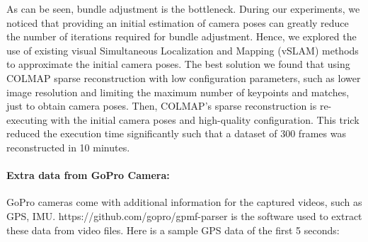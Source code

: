 \documentclass[11pt]{article}
\begin{document}
    As can be seen, bundle adjustment is the bottleneck. During our experiments, we noticed that providing an
    initial estimation of camera poses can greatly reduce the number of iterations required for bundle adjustment.
    Hence, we explored the use of existing visual Simultaneous Localization and Mapping (vSLAM) methods to approximate
    the initial camera poses. The best solution we found that using COLMAP sparse reconstruction with low configuration
    parameters, such as lower image resolution and limiting the maximum number of keypoints and matches, just to obtain
    camera poses. Then, COLMAP's sparse reconstruction is re-executing with the initial camera poses and high-quality configuration.
    This trick reduced the execution time significantly such that a dataset of 300 frames was reconstructed in 10 minutes.

    \paragraph{Extra data from GoPro Camera:}
    GoPro cameras come with additional information for the captured videos, such as GPS, IMU.
    https://github.com/gopro/gpmf-parser is the software used to extract these data from video files.
    Here is a sample GPS data of the first 5 seconds:
\end{document}
